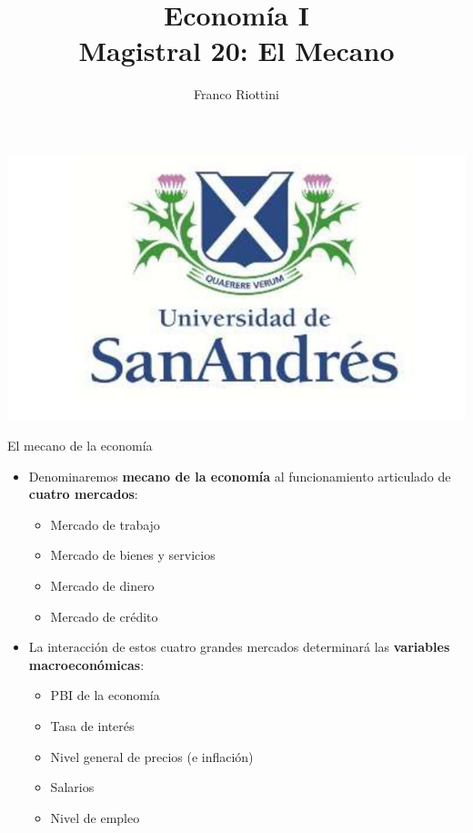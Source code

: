 \documentclass{beamer}
\title[Economía I]{Economía I \vspace{4mm}
\\ Magistral 20: El Mecano}
\date{}
\author[Franco Riottini]{Franco Riottini}
\institute[]{Universidad de San Andrés}
\begin{document}
\begin{frame}
\titlepage
\centering

\includegraphics[scale=0.2]{../Figures/logoUDESA.jpg} 
\end{frame}


\begin{frame}{El mecano de la economía}
\begin{itemize}
    \item Denominaremos \textbf{mecano de la economía} al funcionamiento articulado de \textbf{cuatro mercados}:
    \begin{itemize}
    \item Mercado de trabajo
    \item Mercado de bienes y servicios
    \item Mercado de dinero 
    \item Mercado de crédito    
    \end{itemize}
    \vspace{2mm}
 \item La interacción de estos cuatro grandes mercados determinará las \textbf{variables macroeconómicas}:
    \begin{itemize}
    \item PBI de la economía
    \item Tasa de interés
    \item Nivel general de precios (e inflación)
    \item Salarios  
    \item Nivel de empleo
    \end{itemize}
 \end{itemize}
\end{frame}
\end{document}
